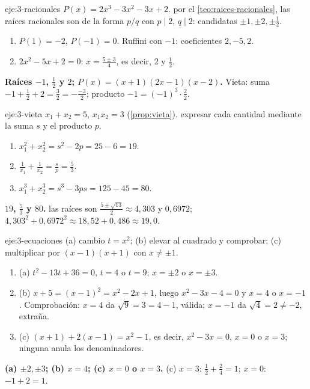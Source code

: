 \begin{solucion}{eje:3-racionales}
\datos $P(x)=2x^3-3x^2-3x+2$.
\planteamiento por el \cref{teo:raices-racionales}, las raíces racionales son de la forma $p/q$ con $p\mid2$, $q\mid2$: candidatas $\pm1,\pm2,\pm\frac12$.
\pasos
\begin{enumerate}[label=\arabic*.]
  \item $P(1)=-2$, $P(-1)=0$. Ruffini con $-1$: coeficientes $2,-5,2$.
  \item $2x^2-5x+2=0$: $x=\frac{5\pm3}4$, es decir, $2$ y $\frac12$.
\end{enumerate}
\resultado \textbf{Raíces $-1$, $\frac12$ y $2$; $P(x)=(x+1)(2x-1)(x-2)$.}
\comprobacion Vieta: suma $-1+\frac12+2=\frac32=-\frac{-3}2$; producto $-1=(-1)^3\cdot\frac22$.
\end{solucion}

\begin{solucion}{eje:3-vieta}
\datos $x_1+x_2=5$, $x_1x_2=3$ (\cref{prop:vieta}).
\planteamiento expresar cada cantidad mediante la suma $s$ y el producto $p$.
\pasos
\begin{enumerate}[label=\arabic*.]
  \item $x_1^2+x_2^2=s^2-2p=25-6=19$.
  \item $\frac1{x_1}+\frac1{x_2}=\frac{s}{p}=\frac53$.
  \item $x_1^3+x_2^3=s^3-3ps=125-45=80$.
\end{enumerate}
\resultado \textbf{$19$, $\frac53$ y $80$.}
\comprobacion las raíces son $\frac{5\pm\sqrt{13}}2\approx4{,}303$ y $0{,}6972$; $4{,}303^2+0{,}6972^2\approx18{,}52+0{,}486\approx19{,}0$.
\end{solucion}

\begin{solucion}{eje:3-ecuaciones}
\planteamiento (a) cambio $t=x^2$; (b) elevar al cuadrado y comprobar; (c) multiplicar por $(x-1)(x+1)$ con $x\neq\pm1$.
\pasos
\begin{enumerate}[label=\arabic*.]
  \item (a) $t^2-13t+36=0$, $t=4$ o $t=9$; $x=\pm2$ o $x=\pm3$.
  \item (b) $x+5=(x-1)^2=x^2-2x+1$, luego $x^2-3x-4=0$ y $x=4$ o $x=-1$. Comprobación: $x=4$ da $\sqrt9=3=4-1$, válida; $x=-1$ da $\sqrt4=2\neq-2$, extraña.
  \item (c) $(x+1)+2(x-1)=x^2-1$, es decir, $x^2-3x=0$, $x=0$ o $x=3$; ninguna anula los denominadores.
\end{enumerate}
\resultado \textbf{(a) $\pm2,\pm3$; (b) $x=4$; (c) $x=0$ o $x=3$.}
\comprobacion (c) $x=3$: $\frac12+\frac24=1$; $x=0$: $-1+2=1$.
\end{solucion}

